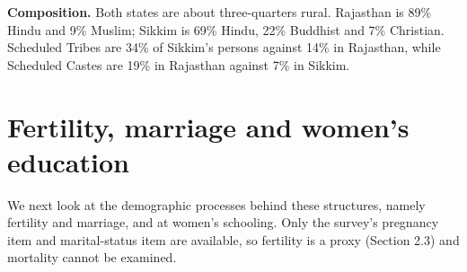 \documentclass[10pt,a4paper]{article}
\begin{document}
\textbf{Composition.} Both states are about three-quarters rural. Rajasthan is 89\% Hindu and 9\% Muslim; Sikkim is 69\% Hindu, 22\% Buddhist and 7\% Christian. Scheduled Tribes are 34\% of Sikkim's persons against 14\% in Rajasthan, while Scheduled Castes are 19\% in Rajasthan against 7\% in Sikkim.


\section{Fertility, marriage and women's education}

We next look at the demographic processes behind these structures, namely fertility and marriage, and at women's schooling. Only the survey's pregnancy item and marital-status item are available, so fertility is a proxy (Section 2.3) and mortality cannot be examined.
\end{document}
